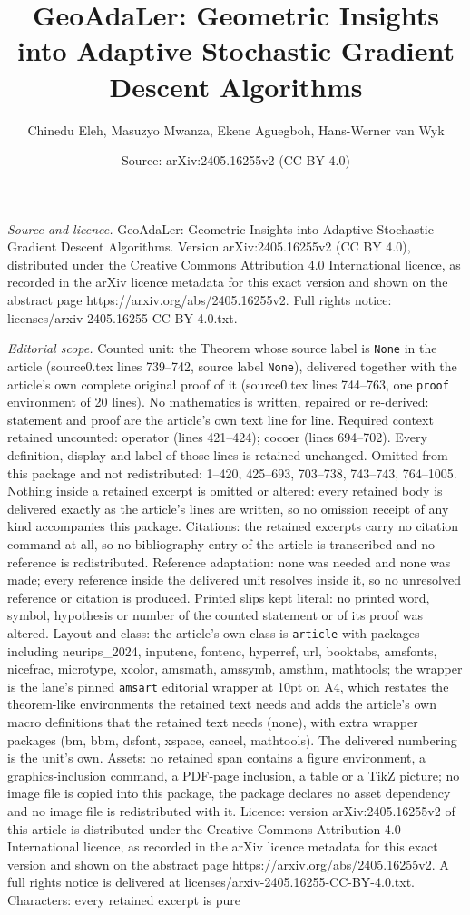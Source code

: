 \documentclass[10pt,a4paper]{amsart}
\title[GeoAdaLer: Geometric Insights into Adaptive Stochastic Gradi]{GeoAdaLer: Geometric Insights into Adaptive Stochastic Gradient Descent Algorithms}
\author{Chinedu Eleh, Masuzyo Mwanza, Ekene Aguegboh, Hans-Werner van Wyk}
\date{Source: arXiv:2405.16255v2 (CC BY 4.0)}
\begin{document}
\maketitle

\noindent\emph{Source and licence.} GeoAdaLer: Geometric Insights into Adaptive Stochastic Gradient Descent Algorithms. Version arXiv:2405.16255v2 (CC BY 4.0), distributed under the Creative Commons Attribution 4.0 International licence, as recorded in the arXiv licence metadata for this exact version and shown on the abstract page https://arxiv.org/abs/2405.16255v2. Full rights notice: licenses/arxiv-2405.16255-CC-BY-4.0.txt.\par\smallskip

\noindent\textit{Editorial scope.} Counted unit: the Theorem whose source label is \texttt{None} in the article (source0.tex lines 739--742, source label \texttt{None}), delivered together with the article's own complete original proof of it (source0.tex lines 744--763, one \texttt{proof} environment of 20 lines). No mathematics is written, repaired or re-derived: statement and proof are the article's own text line for line. Required context retained uncounted: operator (lines 421--424); cocoer (lines 694--702). Every definition, display and label of those lines is retained unchanged. Omitted from this package and not redistributed: 1--420, 425--693, 703--738, 743--743, 764--1005. Nothing inside a retained excerpt is omitted or altered: every retained body is delivered exactly as the article's lines are written, so no omission receipt of any kind accompanies this package. Citations: the retained excerpts carry no citation command at all, so no bibliography entry of the article is transcribed and no reference is redistributed. Reference adaptation: none was needed and none was made; every reference inside the delivered unit resolves inside it, so no unresolved reference or citation is produced. Printed slips kept literal: no printed word, symbol, hypothesis or number of the counted statement or of its proof was altered. Layout and class: the article's own class is \texttt{article} with packages including neurips\_2024, inputenc, fontenc, hyperref, url, booktabs, amsfonts, nicefrac, microtype, xcolor, amsmath, amssymb, amsthm, mathtools; the wrapper is the lane's pinned \texttt{amsart} editorial wrapper at 10pt on A4, which restates the theorem-like environments the retained text needs and adds the article's own macro definitions that the retained text needs (none), with extra wrapper packages (bm, bbm, dsfont, xspace, cancel, mathtools). The delivered numbering is the unit's own. Assets: no retained span contains a figure environment, a graphics-inclusion command, a PDF-page inclusion, a table or a TikZ picture; no image file is copied into this package, the package declares no asset dependency and no image file is redistributed with it. Licence: version arXiv:2405.16255v2 of this article is distributed under the Creative Commons Attribution 4.0 International licence, as recorded in the arXiv licence metadata for this exact version and shown on the abstract page https://arxiv.org/abs/2405.16255v2. A full rights notice is delivered at licenses/arxiv-2405.16255-CC-BY-4.0.txt. Characters: every retained excerpt is pure 
\end{document}
